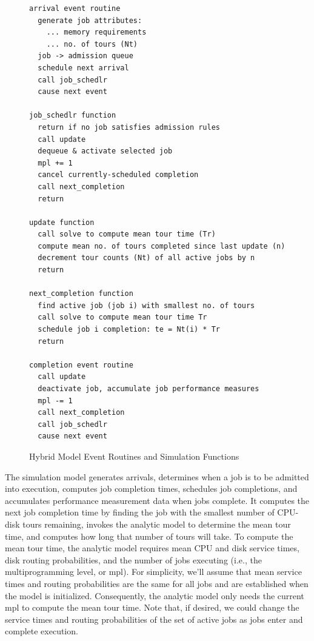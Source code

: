 \begin{figure}[H]
\centering
\begingroup\small
\begin{verbatim}
arrival event routine
  generate job attributes:
    ... memory requirements
    ... no. of tours (Nt)
  job -> admission queue
  schedule next arrival
  call job_schedlr
  cause next event

job_schedlr function
  return if no job satisfies admission rules
  call update
  dequeue & activate selected job
  mpl += 1
  cancel currently-scheduled completion
  call next_completion
  return

update function
  call solve to compute mean tour time (Tr)
  compute mean no. of tours completed since last update (n)
  decrement tour counts (Nt) of all active jobs by n
  return

next_completion function
  find active job (job i) with smallest no. of tours
  call solve to compute mean tour time Tr
  schedule job i completion: te = Nt(i) * Tr
  return

completion event routine
  call update
  deactivate job, accumulate job performance measures
  mpl -= 1
  call next_completion
  call job_schedlr
  cause next event
\end{verbatim}
\endgroup
\caption{Hybrid Model Event Routines and Simulation Functions}
\end{figure}

The simulation model generates arrivals, determines when a job is to be
admitted into execution, computes job completion times, schedules job
completions, and accumulates performance measurement data when jobs complete.
It computes the next job completion time by finding the job with the smallest
number of CPU-disk tours remaining, invokes the analytic model to determine
the mean tour time, and computes how long that number of tours will take. To
compute the mean tour time, the analytic model requires mean CPU and disk
service times, disk routing probabilities, and the number of jobs executing
(i.e., the multiprogramming level, or mpl). For simplicity, we'll assume that
mean service times and routing probabilities are the same for all jobs and are
established when the model is initialized. Consequently, the analytic model
only needs the current mpl to compute the mean tour time. Note that, if
desired, we could change the service times and routing probabilities of the set
of active jobs as jobs enter and complete execution.

